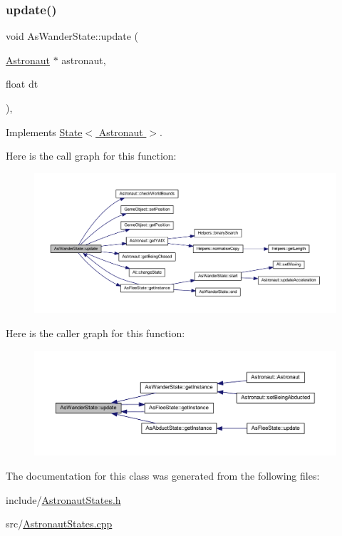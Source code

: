 \subsubsection{\texorpdfstring{update()}{update()}}
{\footnotesize\ttfamily void As\+Wander\+State\+::update (\begin{DoxyParamCaption}\item[{\hyperlink{class_astronaut}{Astronaut} $\ast$}]{astronaut,  }\item[{float}]{dt }\end{DoxyParamCaption})\hspace{0.3cm}{\ttfamily [override]}, {\ttfamily [virtual]}}



Implements \hyperlink{class_state_a30b5f87ed3e3a05fafeaf898e43518ea}{State$<$ Astronaut $>$}.

Here is the call graph for this function\+:
\nopagebreak
\begin{figure}[H]
\begin{center}
\leavevmode
\includegraphics[width=350pt]{class_as_wander_state_ab95b3dd74d0f3109a4778fceda43221d_cgraph}
\end{center}
\end{figure}
Here is the caller graph for this function\+:
\nopagebreak
\begin{figure}[H]
\begin{center}
\leavevmode
\includegraphics[width=350pt]{class_as_wander_state_ab95b3dd74d0f3109a4778fceda43221d_icgraph}
\end{center}
\end{figure}


The documentation for this class was generated from the following files\+:\begin{DoxyCompactItemize}
\item 
include/\hyperlink{_astronaut_states_8h}{Astronaut\+States.\+h}\item 
src/\hyperlink{_astronaut_states_8cpp}{Astronaut\+States.\+cpp}\end{DoxyCompactItemize}

